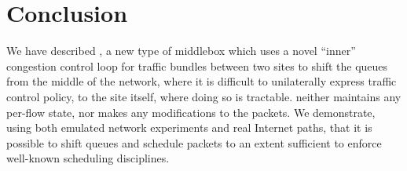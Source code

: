 \section{Conclusion}\label{s:concl}
We have described \name, a new type of middlebox which uses a novel ``inner''  congestion control loop for traffic bundles between two sites to shift the queues from the middle of the network, where it is difficult to unilaterally express traffic control policy, to the site itself, where doing so is tractable. 
\name neither maintains any per-flow state, nor makes any modifications to the packets. 
We demonstrate, using both emulated network experiments and real Internet paths, that it is possible to shift queues and schedule packets to an extent sufficient to enforce well-known scheduling disciplines. 

\vspace{-5pt}


